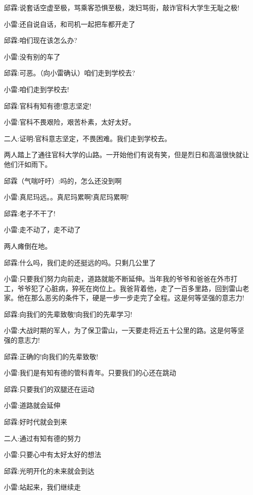 \documentclass[UTF8,12pt,oneside]{ctexbook}
\begin{document}
    邱霖:说套话空虚至极，骂乘客恐惧至极，泼妇骂街，敲诈官科大学生无耻之极!
    
    小雷:还自说自话，和司机一起把车都开走了
    
    邱霖:咱们现在该怎么办?
    
    小雷:没有别的车了
    
    邱霖:可恶。（向小雷确认）咱们走到学校去?
    
    小雷:咱们走到学校去!
    
    邱霖:官科有知有德!意志坚定!
    
    小雷:官科不畏艰险，艰苦朴素，太好太好。
    
    二人:证明:官科意志坚定，不畏困难。我们走到学校去。
    
    \fangsong
    两人踏上了通往官科大学的山路。一开始他们有说有笑，但是烈日和高温很快就让他们汗如雨下。
    
    \songti
    邱霖（气喘吁吁）:吗的，怎么还没到啊
    
    小雷:真尼玛远。。真尼玛累啊!真尼玛累啊!
    
    邱霖:老子不干了!
    
    小雷:走不动了，走不动了
    
    \fangsong
    两人瘫倒在地。
    
    \songti
    邱霖:什么吗，我们走的还挺远的吗。只剩几公里了
    
    小雷:只要我们努力向前走，道路就能不断延伸。当年我的爷爷和爸爸在外市打工，爷爷犯了心脏病，猝死在岗位上。我爸背着他，走了一百多里路，回到雷山老家。他在那么恶劣的条件下，硬是一步一步走完了全程。这是何等坚强的意志力!
    
    邱霖:向我们的先辈致敬!向我们的先辈学习!
    
    小雷:大战时期的军人，为了保卫雷山，一天要走将近五十公里的路。这是何等坚强的意志力!
    
    邱霖:正确的!向我们的先辈致敬!
    
    小雷:我们是有知有德的管科青年。只要我们的心还在跳动
    
    邱霖:只要我们的双腿还在运动
    
    小雷:道路就会延伸
    
    邱霖:好时代就会到来
    
    二人:通过有知有德的努力
    
    小雷:只要心中有太好太好的想法
    
    邱霖:光明开化的未来就会到达
    
    小雷:站起来，我们继续走
    
\end{document}
